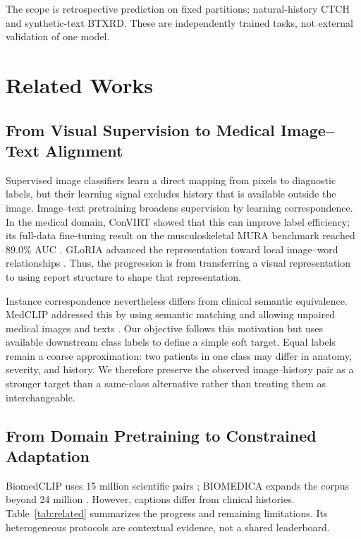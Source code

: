 \documentclass{llncs}
\begin{document}
The scope is retrospective prediction on fixed partitions: natural-history CTCH and synthetic-text BTXRD. These are independently trained tasks, not external validation of one model.

\section{Related Works}
\subsection{From Visual Supervision to Medical Image--Text Alignment}
Supervised image classifiers learn a direct mapping from pixels to diagnostic labels, but their learning signal excludes history that is available outside the image. Image--text pretraining broadens supervision by learning correspondence. In the medical domain, ConVIRT showed that this can improve label efficiency; its full-data fine-tuning result on the musculoskeletal MURA benchmark reached 89.0\% AUC \cite{ConVIRT}. GLoRIA advanced the representation toward local image--word relationships \cite{GLoRIA}. Thus, the progression is from transferring a visual representation to using report structure to shape that representation.

Instance correspondence nevertheless differs from clinical semantic equivalence. MedCLIP addressed this by using semantic matching and allowing unpaired medical images and texts \cite{MedCLIP}. Our objective follows this motivation but uses available downstream class labels to define a simple soft target. Equal labels remain a coarse approximation: two patients in one class may differ in anatomy, severity, and history. We therefore preserve the observed image--history pair as a stronger target than a same-class alternative rather than treating them as interchangeable.

\subsection{From Domain Pretraining to Constrained Adaptation}
BiomedCLIP uses 15 million scientific pairs \cite{BiomedCLIP}; BIOMEDICA expands the corpus beyond 24 million \cite{BIOMEDICA}. However, captions differ from clinical histories. Table~\ref{tab:related} summarizes the progress and remaining limitations. Its heterogeneous protocols are contextual evidence, not a shared leaderboard.
\end{document}
